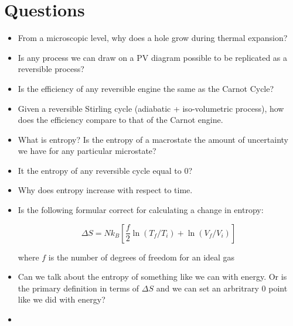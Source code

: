 \documentclass{report}
\begin{document}
\chapter{Questions}
\begin{itemize}
    \item From a microscopic level, why does a hole grow during thermal expansion?
    
    \item Is any process we can draw on a PV diagram possible to be replicated as a reversible process?
    \item Is the efficiency of any reversible engine the same as the Carnot Cycle?
    \item Given a reversible Stirling cycle (adiabatic + iso-volumetric process), how does the efficiency compare to that of the Carnot engine. 
    
    
    
    \item What is entropy? Is the entropy of a macrostate the amount of uncertainty we have for any particular microstate?
    \item It the entropy of any reversible cycle equal to 0?
    \item Why does entropy increase with respect to time.
    \item Is the following formular correct for calculating a change in entropy:
    
    $$\Delta S = Nk_B\left[\frac{f}{2}\ln(T_f/T_i) + \ln(V_f/V_i)\right]$$
    
    where $f$ is the number of degrees of freedom for an ideal gas
    
    \item Can we talk about the entropy of something like we can with energy. Or is the primary definition in terms of $\Delta S$ and we can set an arbritrary 0 point like we did with energy?
    \item 
    
    
    
\end{itemize}

\newpage
\end{document}
